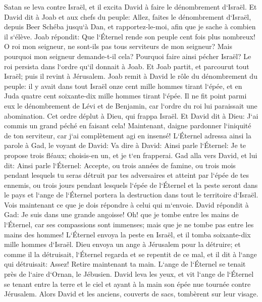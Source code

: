 \verse Satan se leva contre Israël, et il excita David à faire le dénombrement d`Israël. 
\verse Et David dit à Joab et aux chefs du peuple: Allez, faites le dénombrement d`Israël, depuis Beer Schéba jusqu`à Dan, et rapportez-le-moi, afin que je sache à combien il s`élève. 
\verse Joab répondit: Que l`Éternel rende son peuple cent fois plus nombreux! O roi mon seigneur, ne sont-ils pas tous serviteurs de mon seigneur? Mais pourquoi mon seigneur demande-t-il cela? Pourquoi faire ainsi pécher Israël? 
\verse Le roi persista dans l`ordre qu`il donnait à Joab. Et Joab partit, et parcourut tout Israël; puis il revint à Jérusalem. 
\verse Joab remit à David le rôle du dénombrement du peuple: il y avait dans tout Israël onze cent mille hommes tirant l`épée, et en Juda quatre cent soixante-dix mille hommes tirant l`épée. 
\verse Il ne fit point parmi eux le dénombrement de Lévi et de Benjamin, car l`ordre du roi lui paraissait une abomination. 
\verse Cet ordre déplut à Dieu, qui frappa Israël. 
\verse Et David dit à Dieu: J`ai commis un grand péché en faisant cela! Maintenant, daigne pardonner l`iniquité de ton serviteur, car j`ai complètement agi en insensé! 
\verse L`Éternel adressa ainsi la parole à Gad, le voyant de David: 
\verse Va dire à David: Ainsi parle l`Éternel: Je te propose trois fléaux; choisis-en un, et je t`en frapperai. 
\verse Gad alla vers David, et lui dit: Ainsi parle l`Éternel: 
\verse Accepte, ou trois années de famine, ou trois mois pendant lesquels tu seras détruit par tes adversaires et atteint par l`épée de tes ennemis, ou trois jours pendant lesquels l`épée de l`Éternel et la peste seront dans le pays et l`ange de l`Éternel portera la destruction dans tout le territoire d`Israël. Vois maintenant ce que je dois répondre à celui qui m`envoie. 
\verse David répondit à Gad: Je suis dans une grande angoisse! Oh! que je tombe entre les mains de l`Éternel, car ses compassions sont immenses; mais que je ne tombe pas entre les mains des hommes! 
\verse L`Éternel envoya la peste en Israël, et il tomba soixante-dix mille hommes d`Israël. 
\verse Dieu envoya un ange à Jérusalem pour la détruire; et comme il la détruisait, l`Éternel regarda et se repentit de ce mal, et il dit à l`ange qui détruisait: Assez! Retire maintenant ta main. L`ange de l`Éternel se tenait près de l`aire d`Ornan, le Jébusien. 
\verse David leva les yeux, et vit l`ange de l`Éternel se tenant entre la terre et le ciel et ayant à la main son épée nue tournée contre Jérusalem. Alors David et les anciens, couverts de sacs, tombèrent sur leur visage. 
